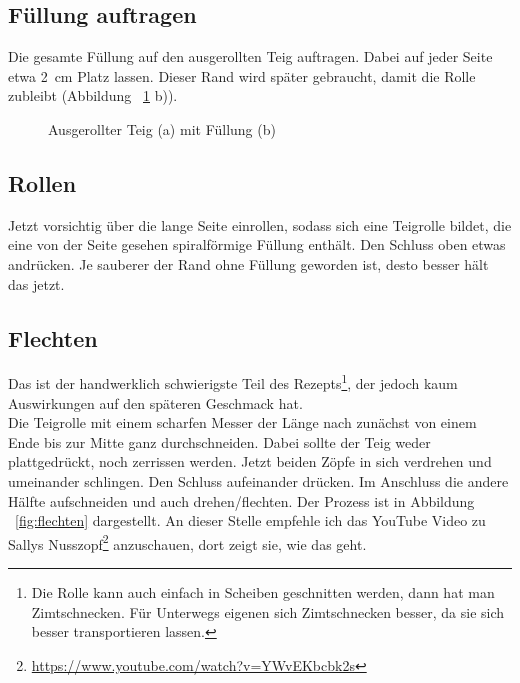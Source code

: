 \documentclass[a4paper, oneside]{recipe}
\begin{document}
\subsection*{Füllung auftragen}
Die gesamte Füllung auf den ausgerollten Teig auftragen. Dabei auf jeder Seite etwa 2~cm Platz lassen. Dieser Rand wird später gebraucht, damit die Rolle zubleibt  
(Abbildung ~\ref{fig:fuellung} b)).

\begin{figure}[h]
  \centering
  \quad
  \caption{Ausgerollter Teig (a) mit Füllung (b)}
  \label{fig:fuellung}
\end{figure}

\subsection*{Rollen}
Jetzt vorsichtig über die lange Seite einrollen, sodass sich eine Teigrolle bildet, die eine von der Seite gesehen spiralförmige Füllung enthält. Den Schluss oben etwas andrücken. Je sauberer der Rand ohne Füllung geworden ist, desto besser hält das jetzt.

\subsection*{Flechten}
Das ist der handwerklich schwierigste Teil des Rezepts\footnote{Die Rolle kann auch einfach in Scheiben geschnitten werden, dann hat man Zimtschnecken. Für Unterwegs eigenen sich Zimtschnecken besser, da sie sich besser transportieren lassen.}, der jedoch kaum Auswirkungen auf den späteren Geschmack hat. \\
Die Teigrolle mit einem scharfen Messer der Länge nach zunächst von einem Ende bis zur Mitte ganz durchschneiden. Dabei sollte der Teig weder plattgedrückt, noch zerrissen werden. Jetzt beiden Zöpfe in sich verdrehen und umeinander schlingen. Den Schluss aufeinander drücken. Im Anschluss die andere Hälfte aufschneiden und auch drehen/flechten. Der Prozess ist in Abbildung ~\ref{fig:flechten} dargestellt. An dieser Stelle empfehle ich das YouTube Video zu Sallys Nusszopf\footnote{\url{https://www.youtube.com/watch?v=YWvEKbcbk2s}} anzuschauen, dort zeigt sie, wie das geht.
\end{document}
